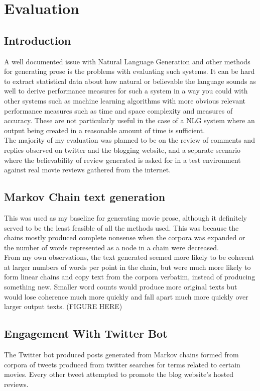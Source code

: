 \chapter{\label{ch:6-evaluation} Evaluation}


\section{Introduction}
A well documented issue with Natural Language Generation and other methods for generating prose is the problems with evaluating such systems. It can be hard to extract statistical data about how natural or believable the language sounds as well to derive performance measures for such a system in a way you could with other systems such as machine learning algorithms with more obvious relevant performance measures such as time and space complexity and measures of accuracy. These are not particularly useful in the case of a NLG system where an output being created in a reasonable amount of time is sufficient.\\

The majority of my evaluation was planned to be on the review of comments and replies observed on twitter and the blogging website, and a separate scenario where the believability of review generated is asked for in a test environment against real movie reviews gathered from the internet.

\section{Markov Chain text generation}
This was used as my baseline for generating movie prose, although it definitely served to be the least feasible of all the methods used. This was because the chains mostly produced complete nonsense when the corpora was expanded or the number of words represented as a node in a chain were decreased.\\
From my own observations, the text generated seemed more likely to be coherent at larger numbers of words per point in the chain, but were much more likely to form linear chains and copy text from the corpora verbatim, instead of producing something new. Smaller word counts would produce more original texts but would lose coherence much more quickly and fall apart much more quickly over larger output texts.
(FIGURE HERE)

\section{Engagement With Twitter Bot}
The Twitter bot produced posts generated from Markov chains formed from corpora of tweets produced from twitter searches for terms related to certain movies. Every other tweet attempted to promote the blog website's hosted reviews.

